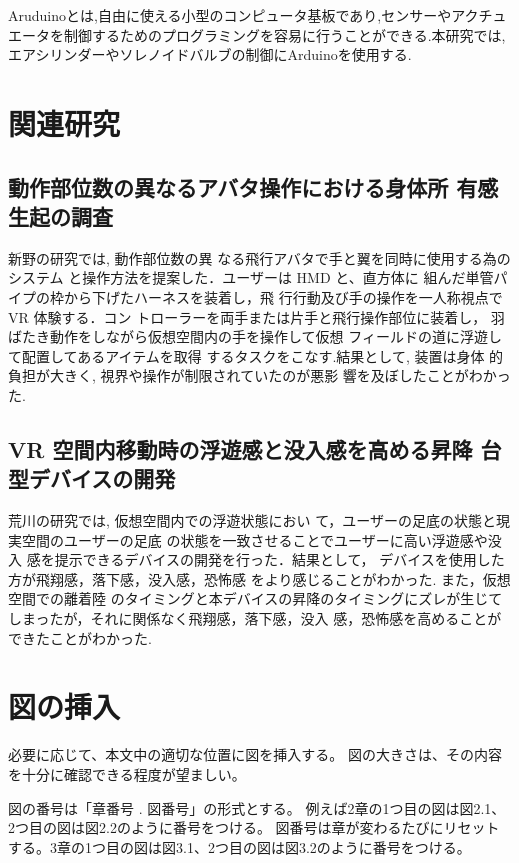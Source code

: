 Aruduinoとは,自由に使える小型のコンピュータ基板であり,センサーやアクチュエータを制御するためのプログラミングを容易に行うことができる.本研究では,エアシリンダーやソレノイドバルブの制御にArduinoを使用する.

\section{関連研究}

\subsection{動作部位数の異なるアバタ操作における身体所
有感生起の調査}

新野の研究では, 動作部位数の異
なる飛行アバタで手と翼を同時に使用する為のシステム
と操作方法を提案した．ユーザーは HMD と、直方体に
組んだ単管パイプの枠から下げたハーネスを装着し，飛
行行動及び手の操作を一人称視点で VR 体験する．コン
トローラーを両手または片手と飛行操作部位に装着し，
羽ばたき動作をしながら仮想空間内の手を操作して仮想
フィールドの道に浮遊して配置してあるアイテムを取得
するタスクをこなす.結果として, 装置は身体
的負担が大きく, 視界や操作が制限されていたのが悪影
響を及ぼしたことがわかった.

\subsection{VR 空間内移動時の浮遊感と没入感を高める昇降
台型デバイスの開発}

荒川の研究では, 仮想空間内での浮遊状態におい
て，ユーザーの足底の状態と現実空間のユーザーの足底
の状態を一致させることでユーザーに高い浮遊感や没入
感を提示できるデバイスの開発を行った．結果として，
デバイスを使用した方が飛翔感，落下感，没入感，恐怖感
をより感じることがわかった. また，仮想空間での離着陸
のタイミングと本デバイスの昇降のタイミングにズレが生じてしまったが，それに関係なく飛翔感，落下感，没入
感，恐怖感を高めることができたことがわかった.

\section{図の挿入}

必要に応じて、本文中の適切な位置に図を挿入する。
図の大きさは、その内容を十分に確認できる程度が望ましい。

図の番号は「章番号 . 図番号」の形式とする。
例えば2章の1つ目の図は図2.1、2つ目の図は図2.2のように番号をつける。
図番号は章が変わるたびにリセットする。3章の1つ目の図は図3.1、2つ目の図は図3.2のように番号をつける。

